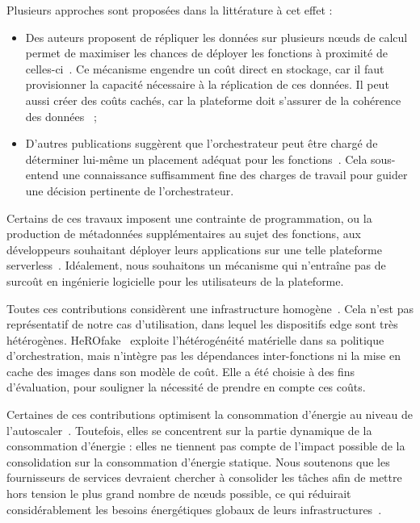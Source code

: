 Plusieurs approches sont proposées dans la littérature à cet effet :

\begin{itemize}
    \item Des auteurs proposent de répliquer les données sur plusieurs nœuds de calcul permet de maximiser les chances de déployer les fonctions à proximité de celles-ci~\cite{smithFaDOFaaSFunctions2022}. Ce mécanisme engendre un coût direct en stockage, car il faut provisionner la capacité nécessaire à la réplication de ces données. Il peut aussi créer des coûts cachés, car la plateforme doit s'assurer de la cohérence des données~\cite{wuTransactionalCausalConsistency2020} ;
    \item D'autres publications suggèrent que l'orchestrateur peut être chargé de déterminer lui-même un placement adéquat pour les fonctions~\cite{abdiPaletteLoadBalancing2023}. Cela sous-entend une connaissance suffisamment fine des charges de travail pour guider une décision pertinente de l'orchestrateur.
\end{itemize}

Certains de ces travaux imposent une contrainte de programmation, ou la production de métadonnées supplémentaires au sujet des fonctions, aux développeurs souhaitant déployer leurs applications sur une telle plateforme serverless~\cite{zijunFassflowEfficient2022, abdiPaletteLoadBalancing2023}. Idéalement, nous souhaitons un mécanisme qui n'entraîne pas de surcoût en ingénierie logicielle pour les utilisateurs de la plateforme.

Toutes ces contributions considèrent une infrastructure homogène~\cite{bhasiCypressInputSizesensitive2022, zijunFassflowEfficient2022, smithFaDOFaaSFunctions2022, zhangFIRSTExploitingMultiDimensional2023, abdiPaletteLoadBalancing2023}. Cela n'est pas représentatif de notre cas d'utilisation, dans lequel les dispositifs edge sont très hétérogènes. HeROfake~\cite{herofake} exploite l'hétérogénéité matérielle dans sa politique d'orchestration, mais n'intègre pas les dépendances inter-fonctions ni la mise en cache des images dans son modèle de coût. Elle a été choisie à des fins d'évaluation, pour souligner la nécessité de prendre en compte ces coûts.

Certaines de ces contributions optimisent la consommation d'énergie au niveau de l'autoscaler~\cite{bhasiCypressInputSizesensitive2022, zhangFIRSTExploitingMultiDimensional2023}. Toutefois, elles se concentrent sur la partie dynamique de la consommation d'énergie : elles ne tiennent pas compte de l'impact possible de la consolidation sur la consommation d'énergie statique. Nous soutenons que les fournisseurs de services devraient chercher à consolider les tâches afin de mettre hors tension le plus grand nombre de nœuds possible, ce qui réduirait considérablement les besoins énergétiques globaux de leurs infrastructures~\cite{leeEnergyEfficientUtilization2012}.

